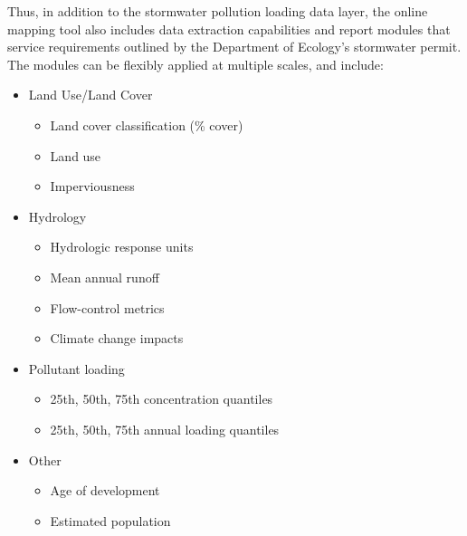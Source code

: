 \documentclass[
]{report}
\providecommand{\tightlist}{%
  \setlength{\itemsep}{0pt}\setlength{\parskip}{0pt}}
\begin{document}
Thus, in addition to the stormwater pollution loading data layer, the online mapping tool also includes data extraction capabilities and report modules that service requirements outlined by the Department of Ecology's stormwater permit. The modules can be flexibly applied at multiple scales, and include:

\begin{itemize}
\tightlist
\item
  Land Use/Land Cover

  \begin{itemize}
  \tightlist
  \item
    Land cover classification (\% cover)\\
  \item
    Land use\\
  \item
    Imperviousness\\
  \end{itemize}
\item
  Hydrology

  \begin{itemize}
  \tightlist
  \item
    Hydrologic response units\\
  \item
    Mean annual runoff\\
  \item
    Flow-control metrics\\
  \item
    Climate change impacts\\
  \end{itemize}
\item
  Pollutant loading

  \begin{itemize}
  \tightlist
  \item
    25th, 50th, 75th concentration quantiles\\
  \item
    25th, 50th, 75th annual loading quantiles\\
  \end{itemize}
\item
  Other

  \begin{itemize}
  \tightlist
  \item
    Age of development\\
  \item
    Estimated population
  \end{itemize}
\end{itemize}
\end{document}
